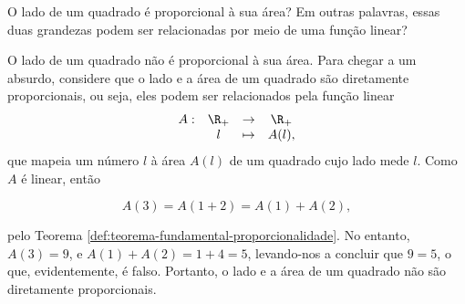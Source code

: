 \begin{example}
O lado de um quadrado é proporcional à sua área? Em outras palavras,
essas duas grandezas podem ser relacionadas por meio de uma função
linear?
\end{example}

\begin{solution}
  O lado de um quadrado não é proporcional à sua área.
  Para chegar a um absurdo, 
  considere que o lado e a área de um quadrado são diretamente proporcionais, ou seja, eles podem
  ser relacionados pela função linear
  \begin{equation*}
  \begin{array}{cccc}
    A : & \R_+ & \to     & \R_+ \\
        &  l & \mapsto & A(l),
  \end{array}
  \end{equation*}
  que mapeia um número $l$ à área $A(l)$ de um quadrado cujo lado mede $l$.
  Como $A$ é linear, então

  $$A(3) = A(1+2)=A(1)+A(2),$$

  \noindent pelo Teorema \ref{def:teorema-fundamental-proporcionalidade}. 
  No entanto, $A(3) = 9$, e $A(1)+A(2) = 1+4 = 5$, levando-nos a concluir que $9=5$, o que, evidentemente,
  é falso. Portanto, o lado e a área de um quadrado não são diretamente proporcionais.
\end{solution}